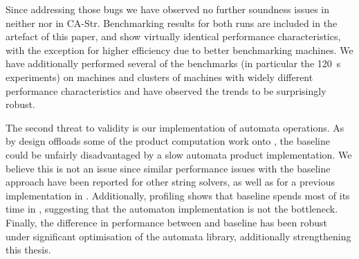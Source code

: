 Since addressing those bugs we have observed no further soundness
issues in neither \Catra{} nor in CA-Str. Benchmarking results for both runs are included
in the artefact of this paper, and show virtually identical performance characteristics,
with the exception for higher efficiency due to better benchmarking machines. We have
additionally performed several of the benchmarks (in particular the \SI{120}{s} experiments)
on machines and clusters of machines with widely different performance characteristics
and have observed the trends to be surprisingly robust.

The second threat to validity is our implementation of automata operations. As
\Calculus{} by design offloads some of the product computation work onto
\Princess{}, the baseline could be unfairly disadvantaged by a slow automata
product implementation. We believe this is not an issue since similar
performance issues with the baseline approach have been reported for other string
solvers, as well as for a previous implementation in \Ostrich{}. Additionally,
profiling shows that baseline spends most of its time in
\Princess{}, suggesting that the automaton implementation is not the bottleneck.
Finally, the difference in performance between \Calculus{} and baseline has been
robust under significant optimisation of the automata library, additionally
strengthening this thesis.

